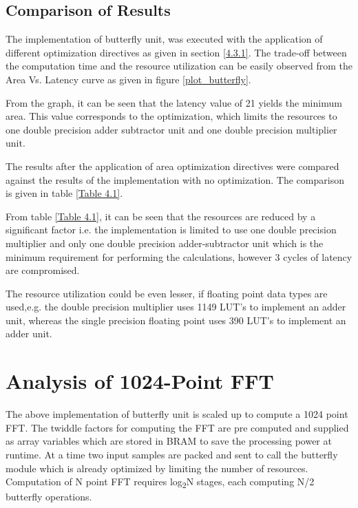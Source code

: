 \subsection{Comparison of Results}
The implementation of butterfly unit, was executed with the application of different optimization directives as given in section \ref{4.3.1}. The trade-off between the computation time and the resource utilization can be easily observed from the Area Vs. Latency curve as given in figure \ref{plot_butterfly}.


From the graph, it can be seen that the latency value of 21 yields the minimum area. This value corresponds to the optimization, which limits the resources to one double precision adder subtractor unit and one double precision multiplier unit. 

The results after the application of area optimization directives were compared against the results of the implementation with no optimization. The comparison is given in table \ref{Table 4.1}.


From table \ref{Table 4.1}, it can be seen that the resources are reduced by a significant factor i.e. the implementation is limited to use one double precision multiplier and only one double precision adder-subtractor unit which is the minimum requirement for performing the calculations, however 3 cycles of latency are compromised. 

The resource utilization could be even lesser, if floating point data types are used,e.g. the double precision multiplier uses 1149 LUT's to implement an adder unit, whereas the single precision floating point uses 390 LUT's to implement an adder unit.

\section {Analysis of 1024-Point FFT}
The above implementation of butterfly unit is scaled up to compute a 1024 point FFT. The twiddle factors for computing the FFT are pre computed and supplied as array variables which are stored in BRAM to save the processing power at runtime. At a time two input samples are packed and sent to call the butterfly module which is already optimized by limiting the number of resources. Computation of N point FFT requires log\textsubscript{2}N stages, each computing N/2 butterfly operations.

